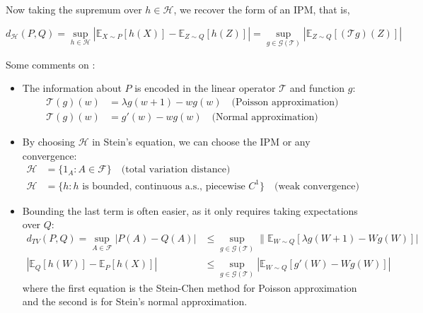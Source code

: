 \documentclass{article}
\begin{document}
Now taking the supremum over $h \in \mathcal{H}$, we recover the form of an IPM, that is,

\begin{equation}\label{eq:stein_ipm_relation}
    d_{\mathcal{H}}(P, Q) = \sup_{h \in \mathcal{H}} |\mathbb{E}_{X\sim P}[h(X)] - \mathbb{E}_{Z\sim Q}[h(Z)]| = \sup_{g \in \mathcal{G}(\mathcal{T})} |\mathbb{E}_{Z\sim Q}[(\mathcal{T}g)(Z)]|
\end{equation}

\begin{remark}\label{rem:stein_ipm_relation}
    Some comments on :
    \begin{itemize}
        \item The information about $P$ is encoded in the linear operator $\mathcal{T}$ and function $g$:
        \begin{align*}
            \mathcal{T}(g)(w) &= \lambda g(w+1) - wg(w) \quad \text{(Poisson approximation)}\\
            \mathcal{T}(g)(w) &= g'(w) - wg(w) \quad \text{(Normal approximation)}
        \end{align*}
        \item By choosing $\mathcal{H}$ in Stein's equation, we can choose the IPM or any convergence:
        \begin{align*}
            \mathcal{H} &= \{1_A: A \in \mathcal{F}\} \quad \text{(total variation distance)}\\
            \mathcal{H} &= \{h: h \text{ is bounded, continuous a.s., piecewise } C^1\} \quad \text{(weak convergence)}
        \end{align*}
        \item Bounding the last term is often easier, as it only requires taking expectations over $Q$:
        \begin{align*}
            d_{TV}(P, Q) = \sup_{A \in \mathcal{F}} |P(A) - Q(A)|&\leq \sup_{g \in \mathcal{G}(\mathcal{T})} \|\mathbb{E}_{W\sim Q}[\lambda g(W+1) - Wg(W)]|
             \\
            |\mathbb{E}_Q[h(W)] - \mathbb{E}_P[h(X)]| &\leq \sup_{g \in \mathcal{G}(\mathcal{T})} |\mathbb{E}_{W\sim Q}[g'(W) - Wg(W)]|
        \end{align*}
        where the first equation is the Stein-Chen method for Poisson approximation and the second is for Stein's normal approximation.
    \end{itemize}
\end{remark}
\end{document}
